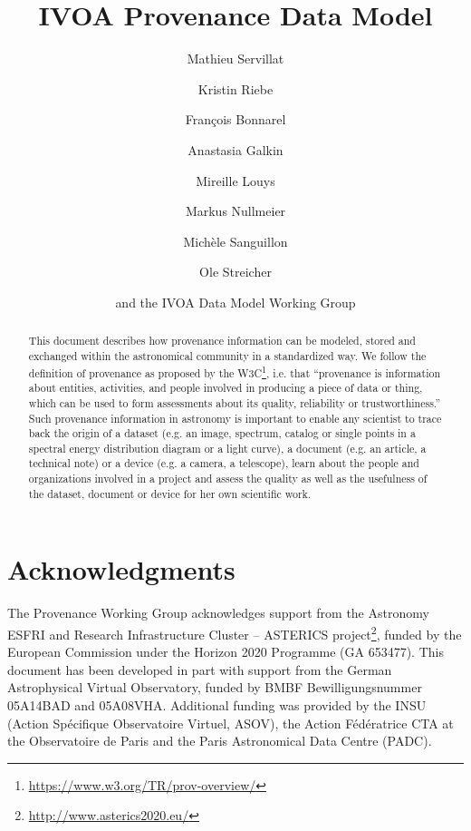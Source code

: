 \documentclass[11pt,a4paper]{ivoa}
\author{Mathieu Servillat}
\author{Kristin Riebe}
\author{François Bonnarel}
\author{Anastasia Galkin}
\author{Mireille Louys}
\author{Markus Nullmeier}
\author{Michèle Sanguillon}
\author{Ole Streicher}
\author{and the IVOA Data Model Working Group}
\begin{document}

\lstset{escapechar=@,style=customc}

\title{IVOA Provenance Data Model}

\begin{abstract}
This document describes how provenance information 
can be modeled, stored and exchanged within 
the astronomical community in a standardized way.
We follow the definition of provenance as proposed by the W3C\footnote{\url{https://www.w3.org/TR/prov-overview/}}, i.e. that ``provenance is information about entities, activities, and people involved in producing a piece of data or thing, which can be used to form assessments about its quality, reliability or trustworthiness.''
Such provenance information in astronomy is important to enable any scientist to trace back the origin of a dataset (e.g. an image, spectrum, catalog or single points in a spectral energy distribution diagram or a light curve), a document (e.g. an article, a technical note) or a device (e.g. a camera, a telescope), learn about the people and organizations involved in a project and assess the quality as well as the usefulness of the dataset, document or device for her own scientific work.
\end{abstract}

\section*{Acknowledgments}

The Provenance Working Group acknowledges support from the Astronomy ESFRI and Research Infrastructure Cluster – ASTERICS project\footnote{\url{http://www.asterics2020.eu/}}, funded by the European Commission under the Horizon 2020 Programme (GA 653477).
This document has been developed in part with support from the German Astrophysical Virtual Observatory, funded by BMBF Bewilligungsnummer 05A14BAD and 05A08VHA.
Additional funding was provided by the INSU (Action Spécifique Observatoire Virtuel, ASOV), the Action Fédératrice CTA at the Observatoire de Paris and the Paris Astronomical Data Centre (PADC).
\end{document}
